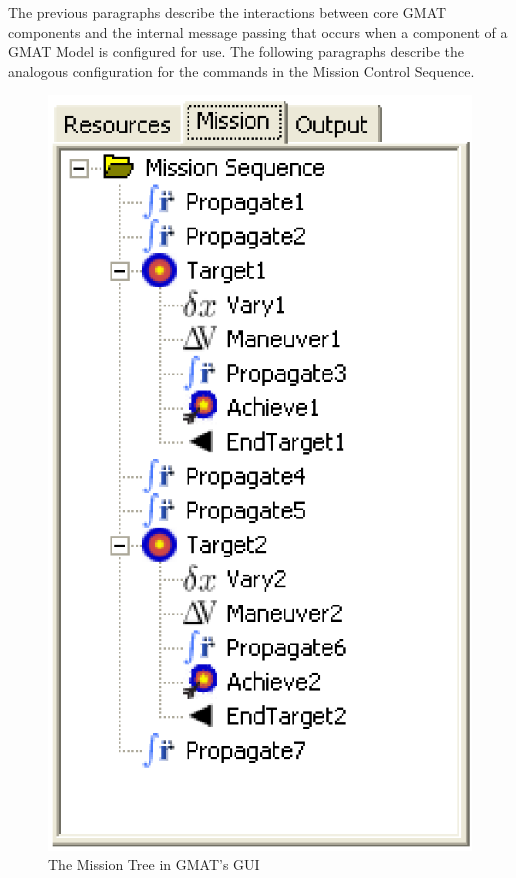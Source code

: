 The previous paragraphs describe the interactions between core GMAT components and the internal
message passing that occurs when a component of a GMAT Model is configured for use.  The following
paragraphs describe the analogous configuration for the commands in the Mission Control Sequence.

\begin{figure}[htb]
\begin{center}
\includegraphics[scale=0.5]{Images/MissionTree.eps}
\caption{\label{figure:MissionTree}The Mission Tree in GMAT's GUI}
\end{center}
\end{figure}

